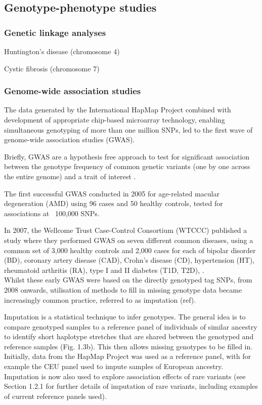 \subsection{Genotype-phenotype studies}
\subsubsection{Genetic linkage analyses}

Huntington's disease (chromosome 4)

Cystic fibrosis (chromosome 7)

\subsubsection{Genome-wide association studies}

The data generated by the International HapMap Project combined with development of appropriate chip-based microarray technology, enabling simultaneous genotyping of more than one million SNPs, led to the first wave of genome-wide association studies (GWAS).

Briefly, GWAS are a hypothesis free approach to test for significant association between the genotype frequency of common genetic variants (one by one across the entire genome) and a trait of interest \cite{mccarthy2008genome}. 

The first successful GWAS conducted in 2005 for age-related macular degeneration (AMD) using 96 cases and 50 healthy controls, tested for associations at ~100,000 SNPs.

In 2007, the Wellcome Trust Case-Control Consortium (WTCCC) published a study where they performed GWAS on seven different common diseases, using a common set of 3,000 healthy controls and 2,000 cases for each of bipolar disorder (BD), coronary artery disease (CAD), Crohn's disease (CD), hypertension (HT), rheumatoid arthritis (RA), type I and II diabetes (T1D, T2D), \cite{wellcome2007genome}.\\ 

Whilst these early GWAS were based on the directly genotyped tag SNPs, from 2008 onwards, utilisation of methods to fill in missing genotype data became increasingly common practice, referred to as imputation (ref). 

Imputation is a statistical technique to infer genotypes. 
The general idea is to compare genotyped samples to a reference panel of individuals of similar ancestry to identify short haplotype stretches that are shared between the genotyped and reference samples (Fig. 1.3b). This then allows missing genotypes to be filled in.
Initially, data from the HapMap Project was used as a reference panel, with for example the CEU panel used to impute samples of European ancestry. 
Imputation is now also used to explore association effects of rare variants (see Section 1.2.1 for further details of imputation of rare variants, including examples of current reference panels used).

